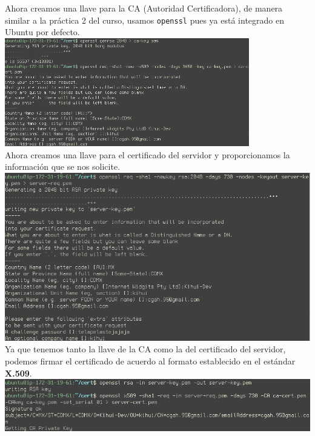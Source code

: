 \documentclass[12pt]{article}
\begin{document}
Ahora creamos una llave para la \textsf{CA} (Autoridad Certificadora), de manera similar a la práctica 2 del curso,  usamos \texttt{openssl} pues ya está integrado en \textsf{Ubuntu} por defecto. \\
\includegraphics[width=0.8\textwidth]{mysql_cert}\\

Ahora creamos una llave para el certificado del servidor y proporcionamos la información que se nos solicite. \\
\includegraphics[width=\textwidth]{mysql_server-key}\\

Ya que tenemos tanto la llave de la \textsf{CA} como la del certificado del servidor, podemos firmar el certificado de acuerdo al formato establecido en el estándar \textbf{X.509}. \\
\includegraphics[width=\textwidth]{mysql_server-cert}\\
\end{document}
